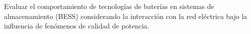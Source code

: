 Evaluar el comportamiento de tecnologías de baterías en sistemas de almacenamiento (BESS) considerando la interacción con la red eléctrica bajo la influencia de fenómenos de calidad de potencia.
